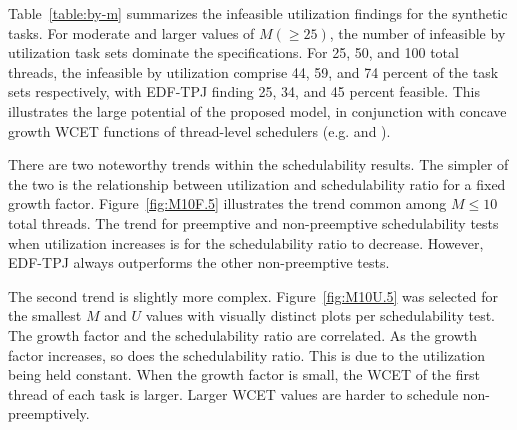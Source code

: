 Table~\ref{table:by-m} summarizes the infeasible utilization
findings for the synthetic tasks. For moderate and larger values of
${M (\ge 25)}$, the number of infeasible by utilization task sets
dominate the specifications. For 25, 50, and 100 total threads, the
infeasible by utilization comprise 44, 59, and 74 percent of the task
sets respectively, with EDF-TPJ finding 25, 34, and 45 percent 
feasible. This illustrates the large potential of the proposed model,
in conjunction with concave growth WCET functions of
thread-level schedulers (e.g. \bundle{} and \bundlep{}).

\begin{figure}[ht]
  \centering
  
\end{figure}

There are two noteworthy trends within the schedulability results.
The simpler of the two is the relationship between utilization and
schedulability ratio for a fixed growth
factor. Figure~\ref{fig:M10F.5} illustrates the trend common among ${M
  \le 10}$ total threads. The trend for preemptive and non-preemptive
schedulability tests when utilization increases is for the
schedulability ratio to decrease. However, EDF-TPJ always outperforms 
the other non-preemptive tests. 

The second trend is slightly more complex. Figure~\ref{fig:M10U.5} was
selected for the smallest ${M}$ and ${U}$ values with visually
distinct plots per schedulability test. The growth factor and the
schedulability ratio are correlated. As the growth factor increases,
so does the schedulability ratio. This is due to the utilization being
held constant. When the growth factor is small, the WCET of the first
thread of each task is larger. Larger WCET values are harder to
schedule non-preemptively.  

